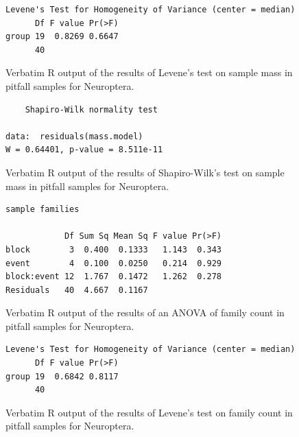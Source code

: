\documentclass[10pt,letterpaper,twocolumn]{article}
\begin{document}
\begin{figure}[h]
	\lstset{numbers=left}
	\lstset{xleftmargin=5mm,framexleftmargin=5mm}
	\begin{lstlisting}
Levene's Test for Homogeneity of Variance (center = median)
      Df F value Pr(>F)
group 19  0.8269 0.6647
      40               
	\end{lstlisting}
	\caption{Verbatim R output of the results of Levene's test on sample mass in pitfall samples for Neuroptera.}
	\label{fig:pitfall_neuroptera_mass_levene}
	\smallskip
	\nointerlineskip
	\hrulefill
\end{figure}

\begin{figure}[h]
	\lstset{numbers=left}
	\lstset{xleftmargin=5mm,framexleftmargin=5mm}
	\begin{lstlisting}
	Shapiro-Wilk normality test

data:  residuals(mass.model)
W = 0.64401, p-value = 8.511e-11
	\end{lstlisting}
	\caption{Verbatim R output of the results of Shapiro-Wilk's test on sample mass in pitfall samples for Neuroptera.}
	\label{fig:pitfall_neuroptera_mass_shapiro}
	\smallskip
	\nointerlineskip
	\hrulefill
\end{figure}

\begin{figure}[h]
	\lstset{numbers=left}
	\lstset{xleftmargin=5mm,framexleftmargin=5mm}
	\begin{lstlisting}
sample families 

            Df Sum Sq Mean Sq F value Pr(>F)
block        3  0.400  0.1333   1.143  0.343
event        4  0.100  0.0250   0.214  0.929
block:event 12  1.767  0.1472   1.262  0.278
Residuals   40  4.667  0.1167               
	\end{lstlisting}
	\caption{Verbatim R output of the results of an ANOVA of family count in pitfall samples for Neuroptera.}
	\label{fig:pitfall_neuroptera_family_anova}
	\smallskip
	\nointerlineskip
	\hrulefill
\end{figure}

\begin{figure}[h]
	\lstset{numbers=left}
	\lstset{xleftmargin=5mm,framexleftmargin=5mm}
	\begin{lstlisting}
Levene's Test for Homogeneity of Variance (center = median)
      Df F value Pr(>F)
group 19  0.6842 0.8117
      40               
	\end{lstlisting}
	\caption{Verbatim R output of the results of Levene's test on family count in pitfall samples for Neuroptera.}
	\label{fig:pitfall_neuroptera_family_levene}
	\smallskip
	\nointerlineskip
	\hrulefill
\end{figure}
\end{document}
